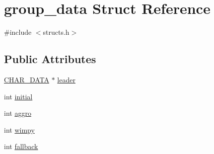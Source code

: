 \hypertarget{structgroup__data}{\section{group\-\_\-data Struct Reference}
\label{structgroup__data}
}


{\ttfamily \#include $<$structs.\-h$>$}

\subsection*{Public Attributes}
\begin{DoxyCompactItemize}
\item 
\hyperlink{structs_8h_af33ed1e66e8541a08bed257124f50f31}{C\-H\-A\-R\-\_\-\-D\-A\-T\-A} $\ast$ \hyperlink{structgroup__data_a76ea922a03414d213839e88f557549a3}{leader}
\item 
int \hyperlink{structgroup__data_a43dac1515f8e79344686fd54792a40da}{initial}
\item 
int \hyperlink{structgroup__data_aa98e119c7e8a340e9290d82e0823b936}{aggro}
\item 
int \hyperlink{structgroup__data_ad6b7ee1c4c0f7b4967aa3f3b0af34d8f}{wimpy}
\item 
int \hyperlink{structgroup__data_ac597af422bc24eea7b833c8f28b534be}{fallback}
\end{DoxyCompactItemize}


